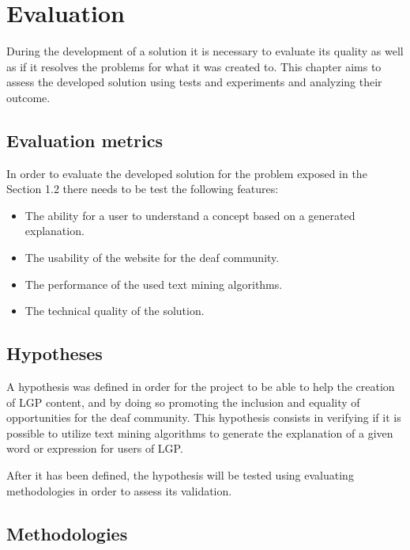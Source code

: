
\chapter{Evaluation} %
\label{chap:Chapter6}

During the development of a solution it is necessary to evaluate its quality as well as if it resolves the problems for what it was created to.
This chapter aims to assess the developed solution using tests and experiments and analyzing their outcome.

\section{Evaluation metrics}

In order to evaluate the developed solution for the problem exposed in the Section 1.2 there needs to be test the following features:

\begin{itemize}
    \item The ability for a user to understand a concept based on a generated explanation.
    \item The usability of the website for the deaf community.
    \item The performance of the used text mining algorithms.
    \item The technical quality of the solution.
\end{itemize}

\section{Hypotheses}

A hypothesis was defined in order for the project to be able to help the creation of \gls{LGP} content, and by doing so promoting the inclusion and equality of opportunities for the deaf community.
This hypothesis consists in verifying if it is possible to utilize text mining algorithms to generate the explanation of a given word or expression for users of \gls{LGP}.

After it has been defined, the hypothesis will be tested using evaluating methodologies in order to assess its validation.

\section{Methodologies}

